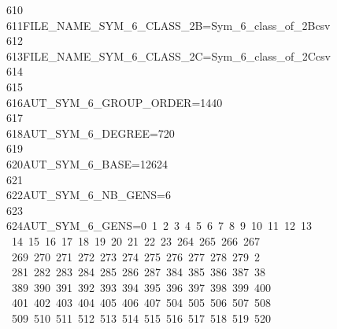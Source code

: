 \begin{tabbing}
610\>\\[0pt]
611\>FILE\_NAME\_SYM\_6\_CLASS\_2B=Sym\_6\_class\_of\_2Bcsv\\[0pt]
612\>\\[0pt]
613\>FILE\_NAME\_SYM\_6\_CLASS\_2C=Sym\_6\_class\_of\_2Ccsv\\[0pt]
614\>\\[0pt]
615\>\\[0pt]
616\>AUT\_SYM\_6\_GROUP\_ORDER=1440\\[0pt]
617\>\\[0pt]
618\>AUT\_SYM\_6\_DEGREE=720\\[0pt]
619\>\\[0pt]
620\>AUT\_SYM\_6\_BASE=12624\\[0pt]
621\>\\[0pt]
622\>AUT\_SYM\_6\_NB\_GENS=6\\[0pt]
623\>\\[0pt]
624\>AUT\_SYM\_6\_GENS=0\ 1\ 2\ 3\ 4\ 5\ 6\ 7\ 8\ 9\ 10\ 11\ 12\ 13\\[0pt]
\>\ 14\ 15\ 16\ 17\ 18\ 19\ 20\ 21\ 22\ 23\ 264\ 265\ 266\ 267\ \\[0pt]
\ 269\ 270\ 271\ 272\ 273\ 274\ 275\ 276\ 277\ 278\ 279\ 2\\[0pt]
\ 281\ 282\ 283\ 284\ 285\ 286\ 287\ 384\ 385\ 386\ 387\ 38\\[0pt]
\ 389\ 390\ 391\ 392\ 393\ 394\ 395\ 396\ 397\ 398\ 399\ 400\\[0pt]
\>\ 401\ 402\ 403\ 404\ 405\ 406\ 407\ 504\ 505\ 506\ 507\ 508\\[0pt]
\>\ 509\ 510\ 511\ 512\ 513\ 514\ 515\ 516\ 517\ 518\ 519\ 520\ \\[0pt]

\end{tabbing}
